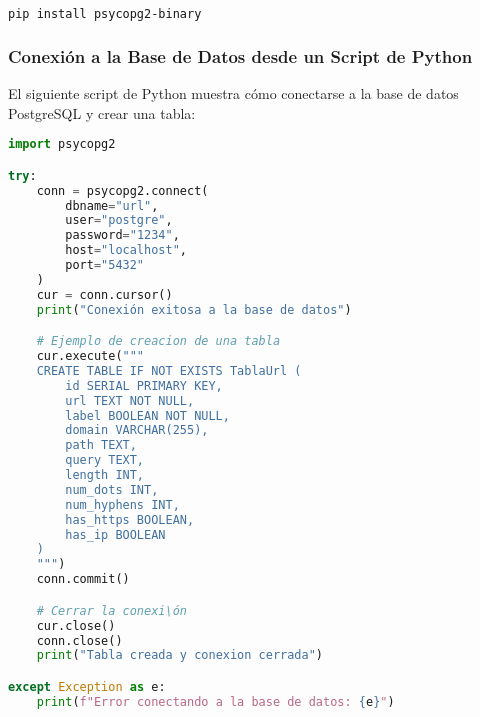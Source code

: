 \begin{lstlisting}[language=bash, caption=Instalación de psycopg2]
pip install psycopg2-binary
\end{lstlisting}

\subsubsection*{Conexión a la Base de Datos desde un Script de Python}
El siguiente script de Python muestra cómo conectarse a la base de datos PostgreSQL y crear una tabla:

\begin{lstlisting}[language=Python, caption=Script de conexión a PostgreSQL y creación de tabla, breaklines=true]
import psycopg2

try:
    conn = psycopg2.connect(
        dbname="url",
        user="postgre",
        password="1234",
        host="localhost",
        port="5432"
    )
    cur = conn.cursor()
    print("Conexión exitosa a la base de datos")

    # Ejemplo de creacion de una tabla
    cur.execute("""
    CREATE TABLE IF NOT EXISTS TablaUrl (
        id SERIAL PRIMARY KEY,
        url TEXT NOT NULL,
        label BOOLEAN NOT NULL,
        domain VARCHAR(255),
        path TEXT,
        query TEXT,
        length INT,
        num_dots INT,
        num_hyphens INT,
        has_https BOOLEAN,
        has_ip BOOLEAN
    )
    """)
    conn.commit()

    # Cerrar la conexi\ón
    cur.close()
    conn.close()
    print("Tabla creada y conexion cerrada")

except Exception as e:
    print(f"Error conectando a la base de datos: {e}")
\end{lstlisting}